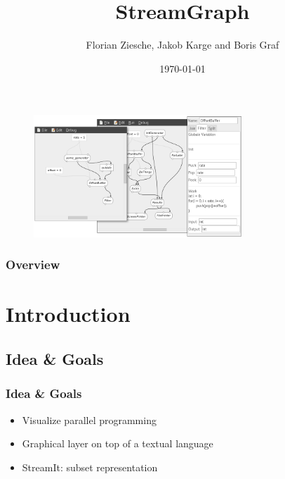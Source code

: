 \documentclass{beamer}
\title[StreamGraph]{StreamGraph} %
\author{Florian Ziesche, Jakob Karge and Boris Graf} %
\institute[TUB] %
{
Technische Universit\"at Berlin\\ %
}
\date{\today} %
\begin{document}
\begin{frame}
\titlepage %
\begin{figure}[H]
		\centering
		\includegraphics[width=0.7\textwidth]{streamgraph}
	\end{figure}
\end{frame}

\begin{frame}
\frametitle{Overview} %
\tableofcontents %
\end{frame}


\section{Introduction}
\subsection{Idea \& Goals}
\begin{frame}
\frametitle{Idea \& Goals}
\begin{itemize}
	\item Visualize parallel programming
	\item Graphical layer on top of a textual language
\end{itemize}
\begin{itemize}
	\item StreamIt: subset representation
\end{itemize}
\end{frame}
\end{document}
